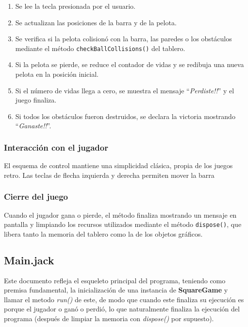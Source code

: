 \documentclass[twocolumn]{article}
\begin{document}
	\begin{enumerate}
		\item Se lee la tecla presionada por el usuario.
		\item Se actualizan las posiciones de la barra y de la pelota.
		\item Se verifica si la pelota colisionó con la barra, las paredes o los obstáculos mediante el método \texttt{checkBallCollisions()} del tablero.
		\item Si la pelota se pierde, se reduce el contador de vidas y se redibuja una nueva pelota en la posición inicial.
		\item Si el número de vidas llega a cero, se muestra el mensaje “\emph{Perdiste!!}” y el juego finaliza.
		\item Si todos los obstáculos fueron destruidos, se declara la victoria mostrando “\emph{Ganaste!!}”.
	\end{enumerate}
	
	\subsubsection{Interacción con el jugador}
	El esquema de control mantiene una simplicidad clásica, propia de los juegos retro. Las teclas de flecha izquierda y derecha permiten mover la barra
	
	\subsubsection{Cierre del juego}
	Cuando el jugador gana o pierde, el método finaliza mostrando un mensaje en pantalla y limpiando los recursos utilizados mediante el método \texttt{dispose()}, que libera tanto la memoria del tablero como la de los objetos gráficos.
	\subsection{Main.jack}
	Este documento refleja el esqueleto principal del programa, teniendo como premisa fundamental, la inicialización de una instancia de \textbf{SquareGame} y llamar el metodo \emph{run()} de este, de modo que cuando este finaliza su ejecución es porque el jugador o ganó o perdió, lo que naturalmente finaliza la ejecución del programa (después de limpiar la memoria con \emph{dispose()} por supuesto). 
	
	
	
	
	
	
	
\end{document}

